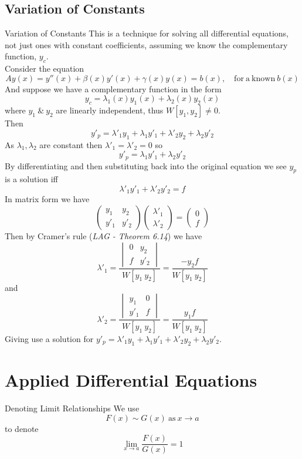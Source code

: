 \documentclass[11pt,a4paper]{article}
\begin{document}
\subsection{Variation of Constants}
%
\subtitle{Theorem 6.13 - }{Variation of Constants}
This is a technique for solving all differential equations, not just ones with constant coefficients, assuming we know the complementary function, $y_c$. \\
Consider the equation $$Ay(x) = y''(x) + \beta(x)y'(x) + \gamma(x)y(x) = b(x),\quad \mathrm{for\ a\ known\ }b(x)$$
And suppose we have a complementary function in the form $$y_c = \lambda_1(x)y_1(x) + \lambda_2(x)y_2(x)$$ where $y_1\ \&\ y_2$ are linearly independent, thus $W[y_1, y_2] \not = 0$. \\
Then $$y'_p = \lambda'_1 y_1 + \lambda_1 y'_1 + \lambda'_2 y_2 + \lambda_2 y'_2$$
As $\lambda_1, \lambda_2$ are constant then $\lambda'_1 = \lambda'_2 = 0$ so $$y'_p = \lambda_1y'_1 + \lambda_2y'_2$$
By differentiating and then substituting back into the original equation we see $y_p$ is a solution iff $$\lambda'_1y'_1 + \lambda'_2y'_2 = f$$
In matrix form we have $$\begin{pmatrix} y_1 & y_2 \\ y'_1 & y'_2 \end{pmatrix} \begin{pmatrix} \lambda'_1 \\ \lambda'_2 \end{pmatrix} = \begin{pmatrix} 0 \\ f \end{pmatrix}$$
Then by Cramer's rule (\textit{LAG - Theorem 6.14}) we have
$$\lambda'_1 = \frac{\begin{vmatrix}0 & y_2 \\ f & y'_2 \end{vmatrix}}{W[y_1\ y_2]} = \frac{-y_2f}{W[y_1\ y_2]}$$
and $$\lambda'_2 = \frac{\begin{vmatrix}y_1 & 0 \\ y'_1 & f \end{vmatrix}}{W[y_1\ y_2]} = \frac{y_1f}{W[y_1\ y_2]}$$
Giving use a solution for $y'_p = \lambda'_1 y_1 + \lambda_1 y'_1 + \lambda'_2 y_2 + \lambda_2 y'_2$.

\section{Applied Differential Equations}
%
\subtitle{Definition 7.01 - }{Denoting Limit Relationships}
We use $$F(x) \sim G(x)\ \mathrm{as}\ x \to a$$ to denote $$\lim_{x \to a} \frac{F(x)}{G(x)} = 1$$
\end{document}
